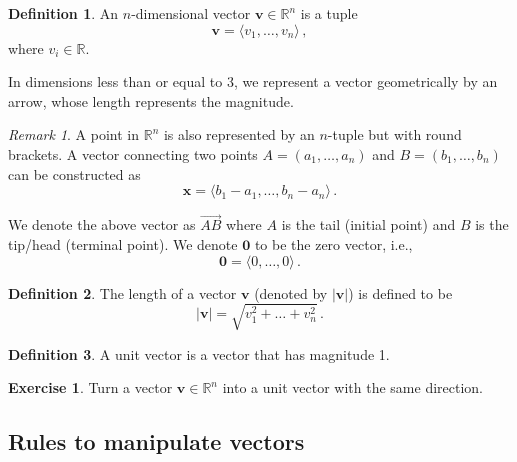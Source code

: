 \documentclass[
]{article}
\theoremstyle{definition}
\newtheorem{definition}{Definition}[section]
\theoremstyle{definition}
\theoremstyle{definition}
\newtheorem{exercise}{Exercise}[section]
\theoremstyle{definition}
\theoremstyle{remark}
\newtheorem*{remark}{Remark}
\begin{document}
\begin{definition}
An \(n\)-dimensional vector \(\textbf{v}\in \mathbb{R}^n\) is a tuple
\begin{equation}
    \textbf{v} = \langle v_1,\dots, v_n \rangle \,,
\end{equation}
where \(v_i \in \mathbb{R}\).
\end{definition}

In dimensions less than or equal to 3, we represent a vector
geometrically by an arrow, whose length represents the magnitude.

\begin{remark}
A point in \(\mathbb{R}^n\) is also represented by an \(n\)-tuple
but with round brackets.
A vector connecting two points \(A= (a_1, \dots, a_n)\)
and \(B=(b_1, \dots, b_n)\) can be constructed as
\begin{equation*}
    \textbf{x} =  \langle b_1-a_1, \dots, b_n - a_n \rangle \,.
\end{equation*}

We denote the above vector as \(\vec{AB}\) where \(A\) is the tail (initial point)
and \(B\) is the tip/head (terminal point).
We denote \(\textbf{0}\) to be the zero vector, i.e.,
\begin{equation*}
    \textbf{0} = \langle 0, \dots, 0 \rangle \,.
\end{equation*}
\end{remark}

\begin{definition}
The length of a vector \(\textbf{v}\) (denoted by \(| \textbf{v}|\)) is defined to be
\begin{equation}
    |\textbf{v}| = \sqrt{ v_1^2 + \dots + v_n^2} \,.
\end{equation}
\end{definition}

\begin{definition}
A unit vector is a vector that has magnitude 1.
\end{definition}

\begin{exercise}
Turn a vector \(\textbf{v} \in \mathbb{R}^n\) into a unit vector with the same
direction.
\end{exercise}

\hypertarget{rules-to-manipulate-vectors}{%
\subsection*{Rules to manipulate vectors}\label{rules-to-manipulate-vectors}}
\end{document}
